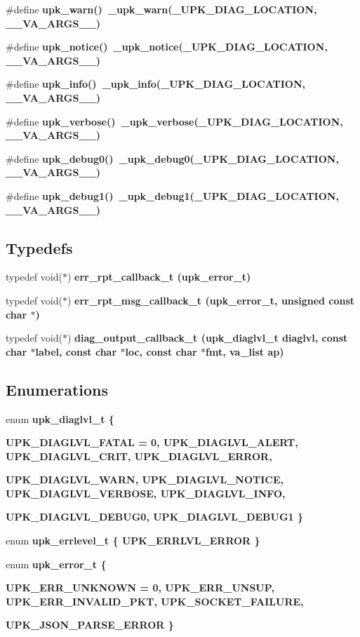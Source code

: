 \begin{CompactItemize}
\item 
\#define \bf{upk\_\-warn}()~\_\-upk\_\-warn(\_\-UPK\_\-DIAG\_\-LOCATION, \_\-\_\-VA\_\-ARGS\_\-\_\-)
\item 
\#define \bf{upk\_\-notice}()~\_\-upk\_\-notice(\_\-UPK\_\-DIAG\_\-LOCATION, \_\-\_\-VA\_\-ARGS\_\-\_\-)
\item 
\#define \bf{upk\_\-info}()~\_\-upk\_\-info(\_\-UPK\_\-DIAG\_\-LOCATION, \_\-\_\-VA\_\-ARGS\_\-\_\-)
\item 
\#define \bf{upk\_\-verbose}()~\_\-upk\_\-verbose(\_\-UPK\_\-DIAG\_\-LOCATION, \_\-\_\-VA\_\-ARGS\_\-\_\-)
\item 
\#define \bf{upk\_\-debug0}()~\_\-upk\_\-debug0(\_\-UPK\_\-DIAG\_\-LOCATION, \_\-\_\-VA\_\-ARGS\_\-\_\-)
\item 
\#define \bf{upk\_\-debug1}()~\_\-upk\_\-debug1(\_\-UPK\_\-DIAG\_\-LOCATION, \_\-\_\-VA\_\-ARGS\_\-\_\-)
\end{CompactItemize}
\subsection*{Typedefs}
\begin{CompactItemize}
\item 
typedef void($\ast$) \bf{err\_\-rpt\_\-callback\_\-t} (\bf{upk\_\-error\_\-t})
\item 
typedef void($\ast$) \bf{err\_\-rpt\_\-msg\_\-callback\_\-t} (\bf{upk\_\-error\_\-t}, unsigned const char $\ast$)
\item 
typedef void($\ast$) \bf{diag\_\-output\_\-callback\_\-t} (\bf{upk\_\-diaglvl\_\-t} diaglvl, const char $\ast$label, const char $\ast$loc, const char $\ast$fmt, va\_\-list ap)
\end{CompactItemize}
\subsection*{Enumerations}
\begin{CompactItemize}
\item 
enum \bf{upk\_\-diaglvl\_\-t} \{ \par
\bf{UPK\_\-DIAGLVL\_\-FATAL} =  0, 
\bf{UPK\_\-DIAGLVL\_\-ALERT}, 
\bf{UPK\_\-DIAGLVL\_\-CRIT}, 
\bf{UPK\_\-DIAGLVL\_\-ERROR}, 
\par
\bf{UPK\_\-DIAGLVL\_\-WARN}, 
\bf{UPK\_\-DIAGLVL\_\-NOTICE}, 
\bf{UPK\_\-DIAGLVL\_\-VERBOSE}, 
\bf{UPK\_\-DIAGLVL\_\-INFO}, 
\par
\bf{UPK\_\-DIAGLVL\_\-DEBUG0}, 
\bf{UPK\_\-DIAGLVL\_\-DEBUG1}
 \}
\item 
enum \bf{upk\_\-errlevel\_\-t} \{ \bf{UPK\_\-ERRLVL\_\-ERROR}
 \}
\item 
enum \bf{upk\_\-error\_\-t} \{ \par
\bf{UPK\_\-ERR\_\-UNKNOWN} =  0, 
\bf{UPK\_\-ERR\_\-UNSUP}, 
\bf{UPK\_\-ERR\_\-INVALID\_\-PKT}, 
\bf{UPK\_\-SOCKET\_\-FAILURE}, 
\par
\bf{UPK\_\-JSON\_\-PARSE\_\-ERROR}
 \}
\end{CompactItemize}
